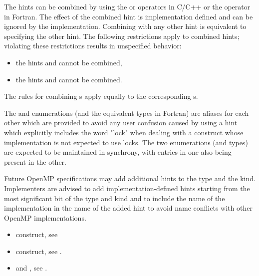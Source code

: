 The hints can be combined by using the \code{+} or \code{|} operators in C/C++ or the \code{+} operator in Fortran.  
The effect of the combined hint is implementation defined and can be ignored by the implementation.
Combining  with any other hint is equivalent to specifying the other hint.
The following restrictions apply to combined hints; violating these 
restrictions results in unspecified behavior:
\begin{itemize}
\item the hints  and  cannot be combined,
\item the hints  and  cannot be combined.
\end{itemize}
The rules for combining s apply equally to the corresponding s.

\begin{note}
The  and  enumerations (and the equivalent types in Fortran) 
are aliases for each other which are provided to avoid any user confusion caused by using a hint which
explicitly includes the word "lock" when dealing with a  construct whose implementation is not
expected to use locks. The two enumerations (and types) are expected to be maintained in synchrony, with
entries in one also being present in the other.

Future OpenMP specifications may add additional hints to the 
 type and the  kind.  
Implementers are advised to add implementation-defined hints starting from 
the most significant bit of the  type and
 kind and to include the name of the 
implementation in the name of the added hint to avoid name conflicts 
with other OpenMP implementations.
\end{note}

\crossreferences
\begin{itemize}
\item {} construct, see

\item {} construct, see 
.
\item {} and
  , see
.
\end{itemize}
